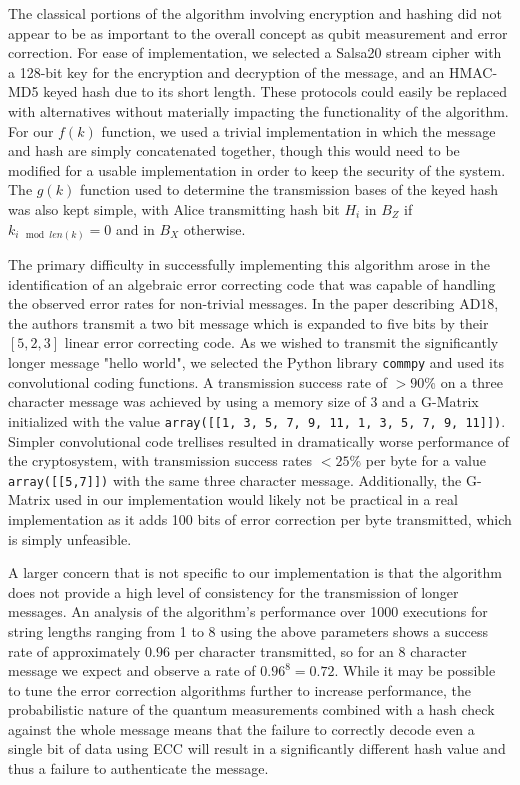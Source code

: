 \documentclass[sigconf]{acmart}
\begin{document}
The classical portions of the algorithm involving encryption and hashing did not appear to be as important to the overall concept as qubit measurement and error correction. For ease of implementation, we selected a Salsa20 stream cipher with a 128-bit key for the encryption and decryption of the message, and an HMAC-MD5 keyed hash due to its short length. These protocols could easily be replaced with alternatives without materially impacting the functionality of the algorithm. For our $f(k)$ function, we used a trivial implementation in which the message and hash are simply concatenated together, though this would need to be modified for a usable implementation in order to keep the security of the system. The $g(k)$ function used to determine the transmission bases of the keyed hash was also kept simple, with Alice transmitting hash bit $H_i$ in $B_Z$ if $k_{i \mod len(k)} = 0$ and in $B_X$ otherwise.

The primary difficulty in successfully implementing this algorithm arose in the identification of an algebraic error correcting code that was capable of handling the observed error rates for non-trivial messages. In the paper describing AD18, the authors transmit a two bit message which is expanded to five bits by their $[5,2,3]$ linear error correcting code. As we wished to transmit the significantly longer message "hello world", we selected the Python library \texttt{commpy} and used its convolutional coding functions. A transmission success rate of $>90\%$ on a three character message was achieved by using a memory size of 3 and a G-Matrix initialized with the value \texttt{array([[1, 3, 5, 7, 9, 11, 1, 3, 5, 7, 9, 11]])}. Simpler convolutional code trellises resulted in dramatically worse performance of the cryptosystem, with transmission success rates $<25\%$ per byte for a value \texttt{array([[5,7]])} with the same three character message. Additionally, the G-Matrix used in our implementation would likely not be practical in a real implementation as it adds 100 bits of error correction per byte transmitted, which is simply unfeasible.

A larger concern that is not specific to our implementation is that the algorithm does not provide a high level of consistency for the transmission of longer messages. An analysis of the algorithm's performance over 1000 executions for string lengths ranging from 1 to 8 using the above parameters shows a success rate of approximately $0.96$ per character transmitted, so for an 8 character message we expect and observe a rate of $0.96^8 = 0.72$. While it may be possible to tune the error correction algorithms further to increase performance, the probabilistic nature of the quantum measurements combined with a hash check against the whole message means that the failure to correctly decode even a single bit of data using ECC will result in a significantly different hash value and thus a failure to authenticate the message.
\end{document}
